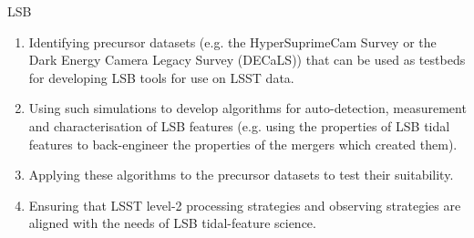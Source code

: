 {\begin{tasklist}{LSB}
\begin{task}
{\begin{enumerate}
\item Identifying precursor datasets (e.g. the HyperSuprimeCam Survey or the Dark Energy Camera Legacy Survey (DECaLS)) that can be used as testbeds for developing LSB tools for use on LSST data.
\item Using  such  simulations   to  develop algorithms for auto-detection, measurement and characterisation of LSB features (e.g. using the properties of LSB tidal features to back-engineer the properties of the mergers which created them).
\item Applying these algorithms to the precursor datasets to test their suitability.
\item Ensuring  that LSST  level-2 processing  strategies and  observing  strategies are  aligned with the needs of LSB tidal-feature science.
\end{enumerate}
}
~\\
\end{task}



\end{tasklist}}
